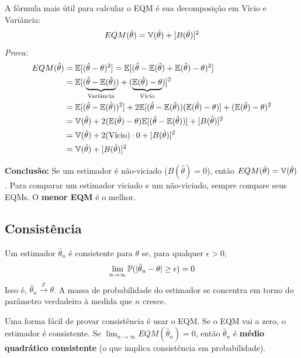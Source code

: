 \begin{propriedade}
A fórmula mais útil para calcular o EQM é sua decomposição em Vício e Variância:
$$ EQM(\hat{\theta}) = \mathbb{V}(\hat{\theta}) + [B(\hat{\theta})]^2 $$
\textit{Prova:}
\begin{align*}
    EQM(\hat{\theta}) &= \mathbb{E}[(\hat{\theta} - \theta)^2] = \mathbb{E}[(\hat{\theta} - \mathbb{E}(\hat{\theta}) + \mathbb{E}(\hat{\theta}) - \theta)^2] \\
    &= \mathbb{E}[(\underbrace{\hat{\theta} - \mathbb{E}(\hat{\theta})}_{\text{Variância}}) + (\underbrace{\mathbb{E}(\hat{\theta}) - \theta}_{\text{Vício}})]^2 \\
    &= \mathbb{E}[(\hat{\theta} - \mathbb{E}(\hat{\theta}))^2] + 2 \mathbb{E}[(\hat{\theta} - \mathbb{E}(\hat{\theta}))(\mathbb{E}(\hat{\theta}) - \theta)] + (\mathbb{E}(\hat{\theta}) - \theta)^2 \\
    &= \mathbb{V}(\hat{\theta}) + 2(\mathbb{E}(\hat{\theta}) - \theta) \mathbb{E}[(\hat{\theta} - \mathbb{E}(\hat{\theta}))] + [B(\hat{\theta})]^2 \\
    &= \mathbb{V}(\hat{\theta}) + 2(\text{Vício}) \cdot 0 + [B(\hat{\theta})]^2 \\
    &= \mathbb{V}(\hat{\theta}) + [B(\hat{\theta})]^2
\end{align*}
\end{propriedade}
\textbf{Conclusão:} Se um estimador é não-viciado ($B(\hat{\theta})=0$), então $EQM(\hat{\theta}) = \mathbb{V}(\hat{\theta})$. Para comparar um estimador viciado e um não-viciado, sempre compare seus EQMs. O \textbf{menor EQM} é o melhor.

\subsection{Consistência}
\begin{definicao}
Um estimador $\hat{\theta}_n$ é consistente para $\theta$ se, para qualquer $\epsilon > 0$,
$$ \lim_{n \to \infty} \mathbb{P}(|\hat{\theta}_n - \theta| \ge \epsilon) = 0 $$
Isso é, $\hat{\theta}_n \xrightarrow{p} \theta$. A massa de probabilidade do estimador se concentra em torno do parâmetro verdadeiro à medida que $n$ cresce.
\end{definicao}

\begin{propriedade}
Uma forma fácil de provar consistência é usar o EQM. Se o EQM vai a zero, o estimador é consistente.
Se $\lim_{n \to \infty} EQM(\hat{\theta}_n) = 0$, então $\hat{\theta}_n$ é \textbf{médio quadrático consistente} (o que implica consistência em probabilidade).
\end{propriedade}

